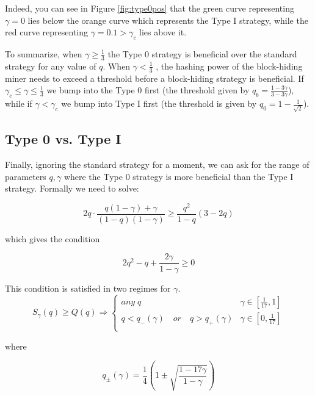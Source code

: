 \documentclass[letterpaper,12pt]{report}
\begin{document}
Indeed, you can see in Figure \ref{fig:type0pos} that the green curve representing $\gamma=0$ lies below the orange curve which represents the Type I strategy, while the red curve representing $\gamma=0.1>\gamma_c$ lies above it.

To summarize, when $\gamma\geq\frac{1}{3}$ the Type 0 strategy is beneficial over the standard strategy for any value of $q$. When $\gamma<\frac{1}{3}$ , the hashing power of the block-hiding miner needs to exceed a threshold before a block-hiding strategy is beneficial. If $\gamma_c\leq\gamma\leq\frac{1}{3}$ we bump into the Type 0 first (the threshold given by $q_b=\frac{1-3\gamma}{3-3\gamma}$), while if $\gamma<\gamma_c$ we bump into Type I first (the threshold is given by $q_0=1-\frac{1}{\sqrt{2}}$).

\subsection{Type 0 vs. Type I}

Finally, ignoring the standard strategy for a moment, we can ask for the range of parameters $q,\gamma$ where the Type 0 strategy is more beneficial than the Type I strategy. Formally we need to solve:

\begin{equation}\label{eq:type0overtype1}
2q\cdot\frac{q(1-\gamma)+\gamma}{(1-q)(1-\gamma)}\geq \dfrac{q^2}{1-q}\left(
3-2q
\right)
\end{equation}

which gives the condition

\begin{equation}\label{eq:type0over1condition}
2q^2-q+\frac{2\gamma}{1-\gamma}\geq 0
\end{equation}

This condition is satisfied in two regimes for $\gamma$.
\begin{equation}\label{eq:type0over1gammaregimes}
S_{\gamma}(q)\geq Q(q) \Longrightarrow
\begin{cases}
\mathit{any\;} q & \gamma\in [\frac{1}{17},1] \\ 
q<q_-(\gamma)\quad \mathit{or}\quad q>q_+(\gamma) & \gamma\in [0,\frac{1}{17}] \\ 
\end{cases}
\end{equation}

where 

\begin{equation}\label{qplusminus}
q_{\pm}(\gamma)=\frac{1}{4}\left(1\pm\sqrt{\frac{1-17\gamma}{1-\gamma}}\right)
\end{equation}
\end{document}
